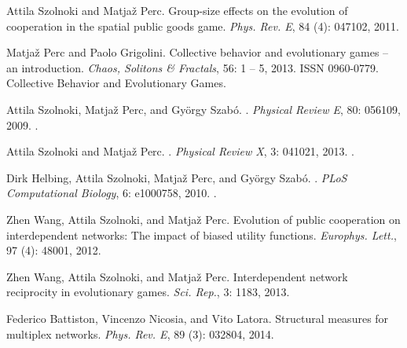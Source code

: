 Attila Szolnoki and Matja{\v z} Perc.
\newblock Group-size effects on the evolution of cooperation in the spatial
public goods game.
\newblock \emph{Phys. Rev. E}, 84 (4): 047102, 2011.

Matjaž Perc and Paolo Grigolini.
\newblock Collective behavior and evolutionary games – an introduction.
\newblock \emph{Chaos, Solitons \& Fractals}, 56: 1 -- 5, 2013.
\newblock ISSN 0960-0779.
\newblock Collective Behavior and Evolutionary Games.

Attila Szolnoki, Matja{\v z} Perc, and Gy{\"o}rgy Szab{\'o}.
.
\newblock \emph{Physical Review E}, 80: 056109, 2009.
\newblock {}.

Attila Szolnoki and Matja{\v z} Perc.
.
\newblock \emph{Physical Review X}, 3: 041021, 2013.
\newblock {}.

Dirk Helbing, Attila Szolnoki, Matja{\v z} Perc, and Gy{\"o}rgy Szab{\'o}.
.
\newblock \emph{PLoS Computational Biology}, 6: e1000758, 2010.
\newblock {}.

Zhen Wang, Attila Szolnoki, and Matja{\v z} Perc.
\newblock Evolution of public cooperation on interdependent networks: {{The}}
impact of biased utility functions.
\newblock \emph{Europhys. Lett.}, 97 (4): 48001, 2012.

Zhen Wang, Attila Szolnoki, and Matja{\v z} Perc.
\newblock Interdependent network reciprocity in evolutionary games.
\newblock \emph{Sci. Rep.}, 3: 1183, 2013{}.

Federico Battiston, Vincenzo Nicosia, and Vito Latora.
\newblock Structural measures for multiplex networks.
\newblock \emph{Phys. Rev. E}, 89 (3): 032804, 2014.

